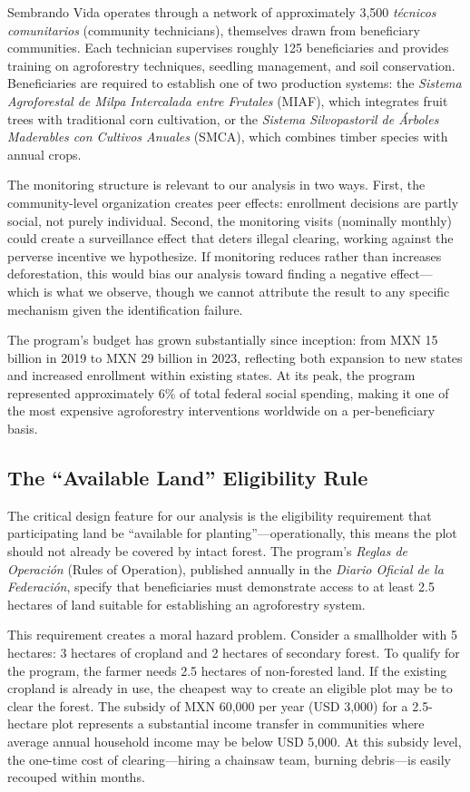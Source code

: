 \documentclass[12pt]{article}
\begin{document}
Sembrando Vida operates through a network of approximately 3,500 \textit{t\'{e}cnicos comunitarios} (community technicians), themselves drawn from beneficiary communities. Each technician supervises roughly 125 beneficiaries and provides training on agroforestry techniques, seedling management, and soil conservation. Beneficiaries are required to establish one of two production systems: the \textit{Sistema Agroforestal de Milpa Intercalada entre Frutales} (MIAF), which integrates fruit trees with traditional corn cultivation, or the \textit{Sistema Silvopastoril de \'{A}rboles Maderables con Cultivos Anuales} (SMCA), which combines timber species with annual crops.

The monitoring structure is relevant to our analysis in two ways. First, the community-level organization creates peer effects: enrollment decisions are partly social, not purely individual. Second, the monitoring visits (nominally monthly) could create a surveillance effect that deters illegal clearing, working against the perverse incentive we hypothesize. If monitoring reduces rather than increases deforestation, this would bias our analysis toward finding a negative effect---which is what we observe, though we cannot attribute the result to any specific mechanism given the identification failure.

The program's budget has grown substantially since inception: from MXN 15 billion in 2019 to MXN 29 billion in 2023, reflecting both expansion to new states and increased enrollment within existing states. At its peak, the program represented approximately 6\% of total federal social spending, making it one of the most expensive agroforestry interventions worldwide on a per-beneficiary basis.

\subsection{The ``Available Land'' Eligibility Rule}

The critical design feature for our analysis is the eligibility requirement that participating land be ``available for planting''---operationally, this means the plot should not already be covered by intact forest. The program's \textit{Reglas de Operaci\'{o}n} (Rules of Operation), published annually in the \textit{Diario Oficial de la Federaci\'{o}n}, specify that beneficiaries must demonstrate access to at least 2.5 hectares of land suitable for establishing an agroforestry system.

This requirement creates a moral hazard problem. Consider a smallholder with 5 hectares: 3 hectares of cropland and 2 hectares of secondary forest. To qualify for the program, the farmer needs 2.5 hectares of non-forested land. If the existing cropland is already in use, the cheapest way to create an eligible plot may be to clear the forest. The subsidy of MXN 60,000 per year (USD 3,000) for a 2.5-hectare plot represents a substantial income transfer in communities where average annual household income may be below USD 5,000. At this subsidy level, the one-time cost of clearing---hiring a chainsaw team, burning debris---is easily recouped within months.
\end{document}

